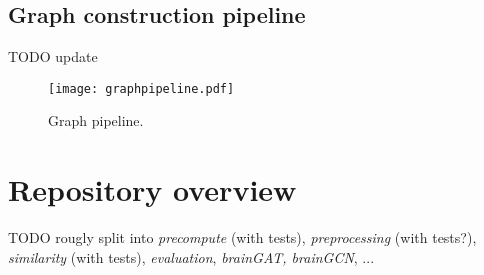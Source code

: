 

\subsection{Graph construction pipeline}
TODO update
\begin{figure}[!ht]
    \texttt{[image: graphpipeline.pdf]}
    \label{graphpipeline}
    \caption{Graph pipeline.}
\end{figure}


\section{Repository overview}

TODO rougly split into \textit{precompute} (with tests), \textit{preprocessing} (with tests?), \textit{similarity} (with tests), \textit{evaluation}, \textit{brainGAT, brainGCN}, ... 

